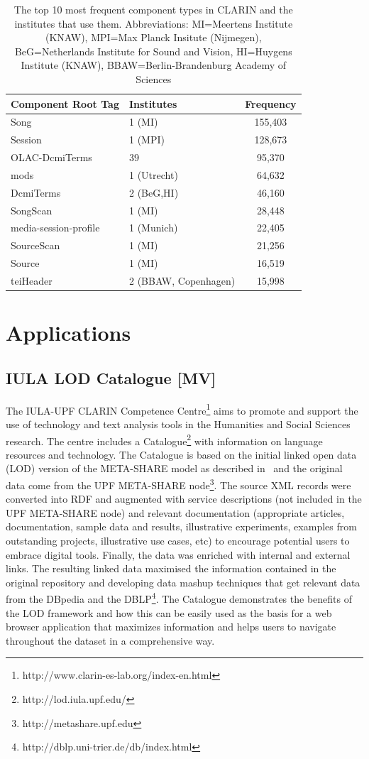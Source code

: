 \documentclass{llncs}
\begin{document}
{\begin{table}
\begin{center}
\begin{tabular}{l|lc}
Component Root Tag & Institutes & Frequency \\
\hline
Song & 1 (MI) & 155,403 \\
Session & 1 (MPI) & 128,673 \\
OLAC-DcmiTerms & 39 & 95,370 \\
mods & 1 (Utrecht)& 64,632 \\
DcmiTerms & 2 (BeG,HI) & 46,160 \\
SongScan & 1 (MI) & 28,448 \\
media-session-profile & 1 (Munich) & 22,405 \\
SourceScan & 1 (MI) & 21,256 \\
Source & 1 (MI) & 16,519 \\
teiHeader & 2 (BBAW, Copenhagen) & 15,998 \\
\end{tabular}
\end{center}
\caption{\label{tab:clarin-types}The top 10 most frequent component types in
CLARIN and the institutes that use them. Abbreviations: MI=Meertens Institute (KNAW),
MPI=Max Planck Insitute (Nijmegen), BeG=Netherlands Institute for Sound and Vision,
HI=Huygens Institute (KNAW), BBAW=Berlin-Brandenburg Academy of Sciences}
\end{table}
\section{Applications}
\label{sec:applications}
\subsection{IULA LOD Catalogue [MV]}
\label{sec:iulalod}
The IULA-UPF CLARIN Competence
Centre\footnote{http://www.clarin-es-lab.org/index-en.html} aims to promote and
support the use of technology and text analysis tools in the Humanities and
Social Sciences research. The centre includes a
Catalogue\footnote{http://lod.iula.upf.edu/} with information on language
resources and technology. The Catalogue is based on the initial linked open data
(LOD) version of the META-SHARE model as described in~\cite{Villegas2014} and
the original data come from the UPF META-SHARE
node\footnote{http://metashare.upf.edu}. The source XML records were converted
into RDF and augmented with service descriptions (not included in the UPF
META-SHARE node) and relevant documentation (appropriate articles,
documentation, sample data and results, illustrative experiments, examples from
outstanding projects, illustrative use cases, etc) to encourage potential users
to embrace digital tools. Finally, the data was enriched with internal and
external links. The resulting linked data maximised the information
contained in the original repository and developing data mashup techniques that get relevant data from the DBpedia and the DBLP\footnote{http://dblp.uni-trier.de/db/index.html}. The Catalogue demonstrates the benefits of the LOD framework and how this can be easily used as the basis for a web browser application that maximizes information and helps users to navigate throughout the dataset in a comprehensive way.
}
\end{document}
